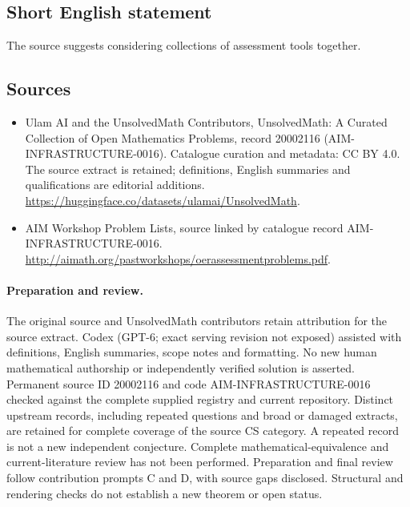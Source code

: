 \documentclass[11pt]{article}
\begin{document}
\subsection{Short English statement}
The source suggests considering collections of assessment tools together.
\subsection{Sources}
\begin{itemize}
\item[\hypertarget{source:20002116:1}{S1}] Ulam AI and the UnsolvedMath Contributors, UnsolvedMath: A Curated Collection of Open Mathematics Problems, record 20002116 (AIM-INFRASTRUCTURE-0016). Catalogue curation and metadata: CC BY 4.0. The source extract is retained; definitions, English summaries and qualifications are editorial additions.
\url{https://huggingface.co/datasets/ulamai/UnsolvedMath}.
\item[\hypertarget{source:20002116:2}{S2}] AIM Workshop Problem Lists, source linked by catalogue record AIM-INFRASTRUCTURE-0016.
\url{http://aimath.org/pastworkshops/oerassessmentproblems.pdf}.
\end{itemize}
\paragraph{Preparation and review.}
The original source and UnsolvedMath contributors retain attribution for the source extract. Codex (GPT-6; exact serving revision not exposed) assisted with definitions, English summaries, scope notes and formatting. No new human mathematical authorship or independently verified solution is asserted. Permanent source ID 20002116 and code AIM-INFRASTRUCTURE-0016 checked against the complete supplied registry and current repository. Distinct upstream records, including repeated questions and broad or damaged extracts, are retained for complete coverage of the source CS category. A repeated record is not a new independent conjecture. Complete mathematical-equivalence and current-literature review has not been performed. Preparation and final review follow contribution prompts C and D, with source gaps disclosed. Structural and rendering checks do not establish a new theorem or open status.
\label{end:20002116}
\end{document}
